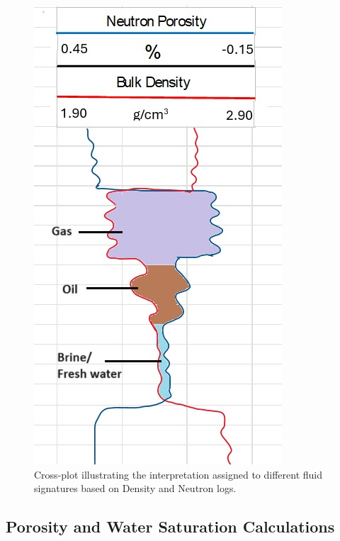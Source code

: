 \documentclass{gji}
\begin{document}
\begin{figure}%
    \centering    \includegraphics[width=\linewidth]{dolomite} %
    \caption{Cross-plot illustrating the interpretation assigned to different fluid signatures based on Density and Neutron logs.}
    \label{fig:shale}
\end{figure}

\subsection{Porosity and Water Saturation Calculations} \label{subsec:porosity}
\end{document}
